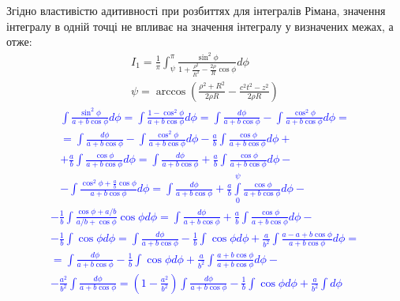 Згідно властивістю адитивності при розбиттях для інтегралів Рімана, 
значення інтегралу в одній точці не впливає на значення інтегралу у 
визначених межах, а отже:
%
\begin{equation*} \begin{aligned}
I_1 = \frac{1}{\pi} \int_{\psi}^{\pi}
\frac{\sin^2{\phi}}{1 + \frac{\rho^2}{R^2} - 
\frac{2 \rho}{R} \cos \phi} d \phi \\
\psi = \arccos \left( \frac{\rho^2 + R^2}{2 \rho R} - 
\frac{c^2 t^2 - z^2}{2 \rho R} \right)
\end{aligned} \end{equation*}
%
\textcolor{blue}{ \begin{equation*} \begin{aligned}
\int \frac{\sin^2{\phi}}{a + b \cos \phi} d \phi = 
\int \frac{1 - \cos^2{\phi}}{a + b \cos \phi} d \phi = 
\int\frac{d \phi}{a + b \cos \phi}  -
\int \frac{\cos^2{\phi}}{a + b \cos \phi} d \phi = \\
= \int \frac{d \phi}{a + b \cos \phi}  - 
\int \frac{\cos^2{\phi}}{a + b \cos \phi} d \phi -
\frac{a}{b} \int \frac{\cos \phi}{a + b \cos \phi} d \phi + \\
+ \frac{a}{b} \int \frac{\cos \phi}{a + b \cos \phi} d \phi = 
\int \frac{d \phi}{a + b \cos \phi} +
\frac{a}{b} \int \frac{\cos \phi}{a + b \cos \phi} d \phi - \\
- \int \frac{\cos^2{\phi} + \frac{a}{b} \cos \phi} {a + b \cos \phi} d \phi =
\int \frac{d \phi}{a + b \cos \phi} + 
\frac{a}{b} \int\limits_{0}^{\psi} \frac{\cos \phi}{a + b \cos \phi} d \phi -
\end{aligned} \end{equation*} }
%
\textcolor{blue}{ \begin{equation*} \begin{aligned}
- \frac{1}{b} \int \frac{\cos \phi + a/b} {a/b +  \cos \phi} \cos \phi d \phi = 
\int \frac{d \phi}{a + b \cos \phi} + 
\frac{a}{b} \int \frac{\cos \phi}{a + b \cos \phi} d \phi - \\
- \frac{1}{b} \int \cos \phi d \phi = \int \frac{d \phi}{a + b \cos \phi} - 
\frac{1}{b} \int \cos \phi d \phi + \frac{a}{b^2} \int
\frac{a - a + b \cos \phi}{a + b \cos \phi} d \phi = \\ 
= \int\frac{d \phi}{a + b \cos \phi} - \frac{1}{b} \int \cos \phi d \phi +
\frac{a}{b^2} \int \frac{a + b \cos \phi}{a + b \cos \phi} d \phi - \\ 
- \frac{a^2}{b^2} \int \frac{d \phi}{a + b \cos \phi} = 
\left( 1 - \frac{a^2}{b^2} \right) \int\frac{d \phi}{a + b \cos \phi} - 
\frac{1}{b} \int \cos \phi d \phi + \frac{a}{b^2} \int d \phi
\end{aligned} \end{equation*} }
